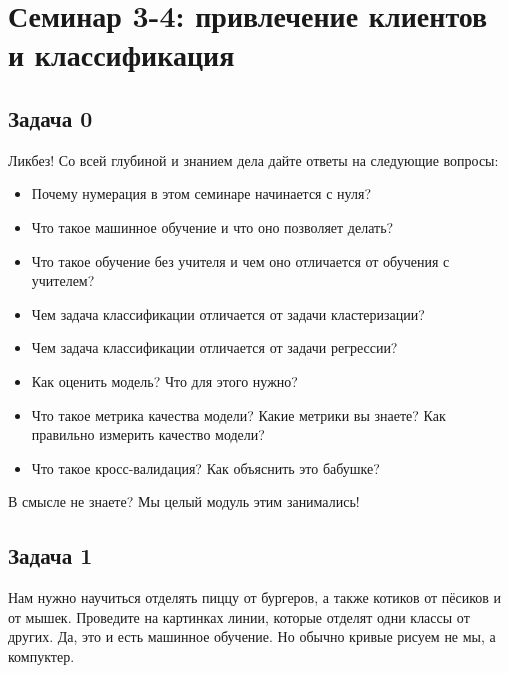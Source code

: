 \documentclass[12pt, a4paper, oneside]{article}
\begin{document}
\section*{Семинар 3-4:  привлечение клиентов и классификация}

\subsection*{Задача 0}

Ликбез!  Со всей глубиной и знанием дела дайте ответы на следующие вопросы: 

\begin{itemize}
\item  Почему нумерация в этом семинаре начинается с нуля? 
\item  Что такое машинное обучение и что оно позволяет делать? 
\item  Что такое обучение без учителя и чем оно отличается от обучения с учителем? 
\item  Чем задача классификации отличается от задачи кластеризации? 
\item  Чем задача классификации отличается от задачи регрессии? 
\item  Как оценить модель? Что для этого нужно? 
\item Что такое метрика качества модели? Какие метрики вы знаете? Как правильно измерить качество модели? 
\item Что такое кросс-валидация?  Как объяснить это бабушке? 
\end{itemize}

В смысле не знаете? Мы целый модуль этим занимались! 


\subsection*{Задача 1}

Нам нужно научиться отделять пиццу от бургеров, а также котиков от пёсиков и от мышек. Проведите на картинках линии, которые отделят одни классы от других.  Да, это и есть машинное обучение. Но обычно кривые рисуем не мы, а компуктер.
\end{document}
